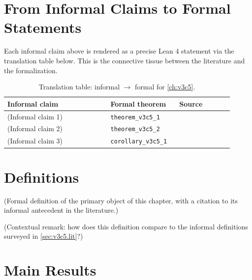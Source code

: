         \section{From Informal Claims to Formal Statements}
        \label{sec:v3c5.bridge}

        Each informal claim above is rendered as a precise Lean 4 statement
        via the translation table below.  This is the connective tissue
        between the literature and the formalization.

        \begin{table}[ht]
        \centering
        \begin{tabular}{p{0.42\linewidth} p{0.28\linewidth} p{0.22\linewidth}}
        \toprule
        \textbf{Informal claim} & \textbf{Formal theorem} & \textbf{Source} \\
        \midrule
        (Informal claim 1) & \texttt{theorem\_v3c5\_1} & \cite{lean4_tpil} \\
        (Informal claim 2) & \texttt{theorem\_v3c5\_2} & \cite{mathlib4} \\
        (Informal claim 3) & \texttt{corollary\_v3c5\_1} & \cite{mac_lane_1998} \\
        \bottomrule
        \end{tabular}
        \caption{Translation table: informal $\rightarrow$ formal for
        \cref{ch:v3c5}.}
        \label{tab:v3c5.bridge}
        \end{table}

        \section{Definitions}

        \begin{definition}
        \label{def:v3c5.1}
          (Formal definition of the primary object of this chapter, with
          a citation to its informal antecedent in the literature.)
        \end{definition}

        \begin{remark}
          (Contextual remark: how does this definition compare to the
          informal definitions surveyed in
          \cref{sec:v3c5.lit}?)
        \end{remark}

        \section{Main Results}

